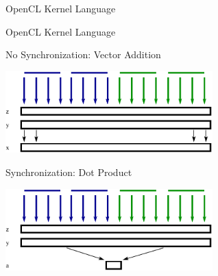 \begin{frame}[fragile]{OpenCL Kernel Language}

\end{frame}


\begin{frame}{OpenCL Kernel Language}

  \begin{block}{No Synchronization: Vector Addition}
   \begin{center} \includegraphics[width=0.6\textwidth]{figures/addition-kernel} \end{center}
  \end{block}
  
  \begin{block}{Synchronization: Dot Product}
   \begin{center} \includegraphics[width=0.6\textwidth]{figures/inner-product-kernel} \end{center}
  \end{block}

\end{frame}


